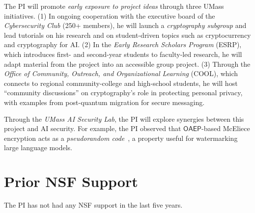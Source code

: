 The PI will promote \emph{early exposure to project ideas} through three UMass initiatives.  
(1) In ongoing cooperation with the executive board of the \emph{Cybersecurity Club} (250+ members), he will 
launch a \emph{cryptography subgroup} and lead tutorials on his research and on student-driven topics such as cryptocurrency and cryptography for AI.  
(2) In the \emph{Early Research Scholars Program} (ESRP), which introduces first- and second-year students 
to faculty-led research, he will adapt material from the project into an accessible group project.  
(3) Through the \emph{Office of Community, Outreach, and Organizational Learning} (COOL), which connects to 
regional community-college and high-school students, he will host ``community discussions'' on cryptography’s 
role in protecting personal privacy, with examples from post-quantum migration for secure messaging.

Through the \emph{UMass AI Security Lab}, the PI will explore synergies between this project 
and AI security. For example, the PI observed that $\mathsf{OAEP}$-based McEliece encryption 
acts as a \emph{pseudorandom code}~\cite{C:CriGun24}, a property useful for watermarking 
large language models. %

 \section{Prior NSF Support}
 
The PI has not had any NSF support in the last five years.

 


